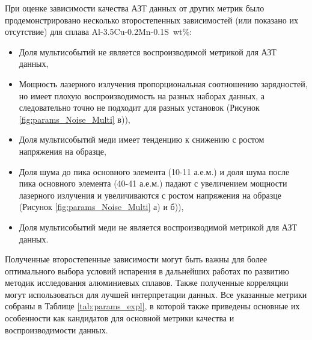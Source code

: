 При оценке зависимости качества АЗТ данных от других метрик было продемонстрировано несколько второстепенных зависимостей (или показано их отсутствие) для сплава Al-3.5Cu-0.2Mn-0.1S~wt\%:

\begin{itemize}
	\item Доля мультисобытий не является воспроизводимой метрикой для АЗТ данных,
	\item Мощность лазерного излучения пропорциональная соотношению зарядностей, но имеет плохую воспроизводимость на разных наборах данных, а следовательно точно не подходит для разных установок (Рисунок \cref{fig:params_Noise_Multi} в)),	
	\item Доля мультисобытий меди имеет тенденцию к снижению с ростом напряжения на образце,
	\item Доля шума до пика основного элемента (10-11 а.е.м.) и доля шума после пика основного элемента (40-41 а.е.м.)	падают с увеличением мощности лазерного излучения и увеличиваются с ростом напряжения на образце (Рисунок \cref{fig:params_Noise_Multi} а) и б)),
	\item Доля мультисобытий меди не является воспроизводимой метрикой для АЗТ данных.	
\end{itemize}

Полученные второстепенные зависимости могут быть важны для более оптимального выбора условий испарения в дальнейших работах по развитию методик исследования алюминиевых сплавов. Также полученные корреляции могут использоваться для лучшей интерпретации данных. Все указанные метрики собраны в Таблице \cref{tab:params_expl}, в которой также приведены основные их особенности как кандидатов для основной метрики качества и воспроизводимости данных.


